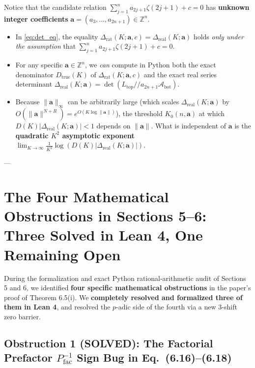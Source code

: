 \documentclass[11pt,a4paper]{article}
\begin{document}
Notice that the candidate relation $\sum_{j=1}^n a_{2j+1}\zeta(2j+1) + c = 0$ has \textbf{unknown integer coefficients} $\mathbf{a} = (a_3, \dots, a_{2n+1}) \in \mathbb{Z}^n$.
\begin{itemize}
  \item In \eqref{eq:det_eq}, the equality $\Delta_{\mathrm{rat}}(K; \mathbf{a}, c) = \Delta_{\mathrm{real}}(K; \mathbf{a})$ holds \emph{only under the assumption} that $\sum_{j=1}^n a_{2j+1}\zeta(2j+1) + c = 0$.
  \item For any specific $\mathbf{a} \in \mathbb{Z}^n$, we \emph{can} compute in Python both the exact denominator $D_{\mathrm{true}}(K)$ of $\Delta_{\mathrm{rat}}(K; \mathbf{a}, c)$ and the exact real series determinant $\Delta_{\mathrm{real}}(K; \mathbf{a}) = \det(L_{\mathrm{top}} // a_{2n+1}\mathcal{A}_{\mathrm{bot}})$.
  \item Because $\|\mathbf{a}\|_\infty$ can be arbitrarily large (which scales $\Delta_{\mathrm{real}}(K; \mathbf{a})$ by $O(\|\mathbf{a}\|^{N+R}) = e^{O(K \log \|\mathbf{a}\|)}$), the threshold $K_0(n, \mathbf{a})$ at which $D(K)|\Delta_{\mathrm{real}}(K; \mathbf{a})| < 1$ depends on $\|\mathbf{a}\|$. What is independent of $\mathbf{a}$ is the \textbf{quadratic $K^2$ asymptotic exponent} $\lim_{K\to\infty} \frac{1}{K^2}\log(D(K)|\Delta_{\mathrm{real}}(K; \mathbf{a})|)$.
\end{itemize}

---

\section{The Four Mathematical Obstructions in Sections 5--6: Three Solved in Lean 4, One Remaining Open}

During the formalization and exact Python rational-arithmetic audit of Sections 5 and 6, we identified \textbf{four specific mathematical obstructions} in the paper's proof of Theorem 6.5(i). We \textbf{completely resolved and formalized three of them in Lean 4}, and resolved the $p$-adic side of the fourth via a new 3-shift zero barrier.

\subsection{Obstruction 1 (SOLVED): The Factorial Prefactor $P_{\mathrm{fac}}^{-1}$ Sign Bug in Eq.\ (6.16)--(6.18)}
\end{document}
